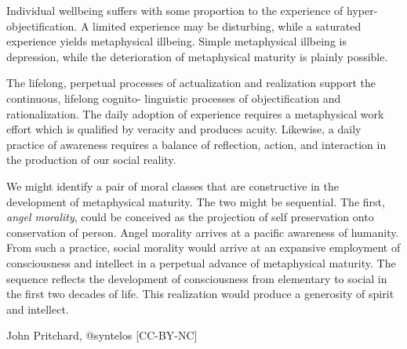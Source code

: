 Individual wellbeing suffers with some proportion to the experience of
hyper- objectification.  A limited experience may be disturbing, while
a saturated experience yields metaphysical illbeing.  Simple
metaphysical illbeing is depression, while the deterioration of
metaphysical maturity is plainly possible.

The lifelong, perpetual processes of actualization and realization
support the continuous, lifelong cognito- linguistic processes of
objectification and rationalization.  The daily adoption of experience
requires a metaphysical work effort which is qualified by veracity and
produces acuity.  Likewise, a daily practice of awareness requires a
balance of reflection, action, and interaction in the production of
our social reality.

We might identify a pair of moral classes that are constructive in the
development of metaphysical maturity.  The two might be sequential.
The first, {\it angel morality}\/, could be conceived as the
projection of self preservation onto conservation of person.  Angel
morality arrives at a pacific awareness of humanity.  From such a
practice, social morality would arrive at an expansive employment of
consciousness and intellect in a perpetual advance of metaphysical
maturity.  The sequence reflects the development of consciousness from
elementary to social in the first two decades of life.  This
realization would produce a generosity of spirit and intellect.  


{\tail John Pritchard, @syntelos [CC-BY-NC]}

\bye
